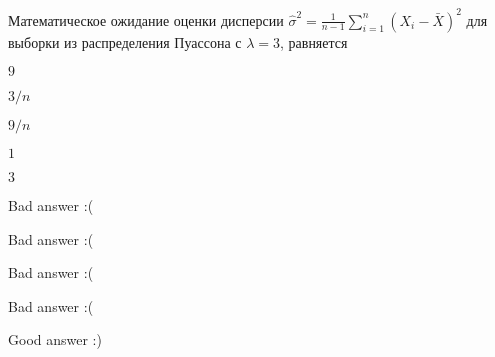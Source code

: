 
\begin{question}
Математическое ожидание оценки дисперсии
\(\hat \sigma^2=\frac{1}{n-1}\sum_{i=1}^{n}(X_i - \bar X)^2\) для
выборки из распределения Пуассона с \(\lambda = 3\), равняется
\begin{answerlist}
  \item \(9\)
  \item \(3/n\)
  \item \(9/n\)
  \item \(1\)
  \item \(3\)
\end{answerlist}
\end{question}

\begin{solution}
\begin{answerlist}
  \item Bad answer :(
  \item Bad answer :(
  \item Bad answer :(
  \item Bad answer :(
  \item Good answer :)
\end{answerlist}
\end{solution}

